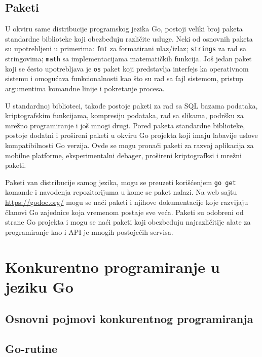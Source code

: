 \documentclass[12pt,oneside]{memoir}
\begin{document}
\section{Paketi}

U okviru same distribucije programskog jezika Go, postoji veliki broj paketa standardne biblioteke koji obezbeđuju različite usluge. Neki od osnovnih paketa su upotrebljeni u primerima: \texttt{fmt} za formatirani ulaz/izlaz; \texttt{strings} za rad sa stringovima; \texttt{math} sa implementacijama matematičkih funkcija. Još jedan paket koji se često upotrebljava je \texttt{os} paket koji predstavlja interfejs ka operativnom sistemu i omogućava funkcionalnosti kao što su rad sa fajl sistemom, pristup argumentima komandne linije i pokretanje procesa.

U standardnoj biblioteci, takođe postoje paketi za rad sa SQL bazama podataka, kriptografskim funkcijama, kompresiju podataka, rad sa slikama,  podršku za mrežno programiranje i još mnogi drugi. Pored paketa standardne biblioteke, postoje dodatni i prošireni paketi u okviru Go projekta koji imaju labavije uslove kompatibilnosti Go verzija. Ovde se mogu pronaći paketi za razvoj aplikacija za mobilne platforme, eksperimentalni debager, prošireni kriptografksi i mrežni paketi. 

Paketi van distribucije samog jezika, mogu se preuzeti korišćenjem \texttt{go get} komande i navođenja repozitorijuma u kome se paket nalazi. Na web sajtu \url{https://godoc.org/} mogu se naći paketi i njihove dokumentacije koje razvijaju članovi Go zajednice koja vremenom postaje sve veća. Paketi su odobreni od strane Go projekta i mogu se naći paketi koji obezbeđuju najrazličitije alate za programiranje kao i API-je mnogih postojećih servisa.


\chapter{Konkurentno programiranje u jeziku Go} \label{conc}

\section{Osnovni pojmovi konkurentnog programiranja}

\section{Go-rutine}
\end{document}
